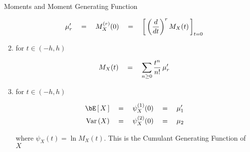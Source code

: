 \documentclass{article}
\begin{document}
\begin{ssection}{Moments and Moment Generating Function}
\begin{result}
\begin{enumerate}[label=(\roman*)]
				\begin{align*}
				\mu'_r	\quad = \quad	M_X^{(r)}(0)	\quad = \quad	\left[\,{\left( {\frac{d}{d {t}}} \right)^r M_X(t)}\,\right]_{t = 0}
				\end{align*}

			\item for $t \in (-h, h)$

				\begin{align*}
					M_X(t)	\quad = \quad	\sum_{n \ge 0} \frac{t^n}{n!}\, \mu'_r
				\end{align*}

			\item for $t \in (-h, h)$

				\begin{align*}
					\E{X}	&\eq	\psi_X^{(1)}(0)	\eq	\mu'_1 \\
					\var{X}	&\eq	\psi_X^{(2)}(0)	\eq	\mu_2
				\end{align*}

				where $\psi_X(t) = \ln{M_X(t)}$. This is the Cumulant Generating Function of $X$
		\end{enumerate}
	\end{result}

\end{ssection}
\end{document}
